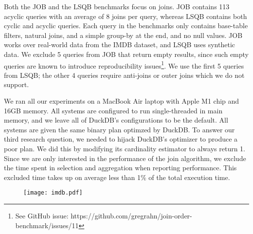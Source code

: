 
Both  the JOB and the LSQB benchmarks  focus on joins.
JOB contains 113 acyclic queries with an average of 8 joins per query,
whereas LSQB contains both cyclic and acyclic queries.
Each query in the benchmarks only contains base-table filters,
natural joins, and a simple group-by at the end,
and no null values.
JOB works over real-world data from the IMDB dataset,
and LSQB uses synthetic data.
We exclude 5 queries from JOB that return empty results,
since such empty queries are known to introduce reproducibility issues\footnote{
  See GitHub issue: https://github.com/gregrahn/join-order-benchmark/issues/11
}.
We use the first 5 queries from LSQB; the other 4 queries require
anti-joins or outer joins which we do not support.

We ran all our experiments on a MacBook Air laptop with Apple M1 chip and 16GB memory.
All systems are configured to run single-threaded in main memory,
and we leave all of DuckDB's configurations to be the default.
All systems are given the same binary plan optimzed by DuckDB.
To answer our third research question,
we needed to hijack DuckDB's optimizer to produce a poor plan.
We did this by modifying its cardinality estimator to always return 1.
Since we are only interested in the performance of the join algorithm,
we exclude the time spent in selection and aggregation
when reporting performance.
This excluded time takes up on average less than 1\% of the total execution time.

\begin{figure}
  \centering
  \texttt{[image: imdb.pdf]}
  \label{fig:eval:imdb}
\end{figure}%

